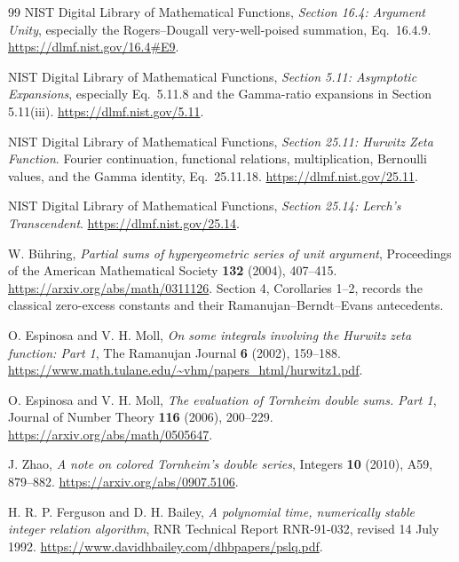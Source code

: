 \begin{thebibliography}{99}
NIST Digital Library of Mathematical Functions,
\emph{Section 16.4: Argument Unity}, especially the Rogers--Dougall
very-well-poised summation, Eq.~16.4.9.
\url{https://dlmf.nist.gov/16.4#E9}.

NIST Digital Library of Mathematical Functions,
\emph{Section 5.11: Asymptotic Expansions}, especially Eq.~5.11.8
and the Gamma-ratio expansions in Section 5.11(iii).
\url{https://dlmf.nist.gov/5.11}.

NIST Digital Library of Mathematical Functions,
\emph{Section 25.11: Hurwitz Zeta Function}.
Fourier continuation, functional relations, multiplication,
Bernoulli values, and the Gamma identity, Eq.~25.11.18.
\url{https://dlmf.nist.gov/25.11}.

NIST Digital Library of Mathematical Functions,
\emph{Section 25.14: Lerch's Transcendent}.
\url{https://dlmf.nist.gov/25.14}.

W. B\"uhring,
\emph{Partial sums of hypergeometric series of unit argument},
Proceedings of the American Mathematical Society \textbf{132}
(2004), 407--415.
\url{https://arxiv.org/abs/math/0311126}.
Section 4, Corollaries 1--2, records the classical zero-excess
constants and their Ramanujan--Berndt--Evans antecedents.

O. Espinosa and V. H. Moll,
\emph{On some integrals involving the Hurwitz zeta function: Part 1},
The Ramanujan Journal \textbf{6} (2002), 159--188.
\url{https://www.math.tulane.edu/~vhm/papers_html/hurwitz1.pdf}.

O. Espinosa and V. H. Moll,
\emph{The evaluation of Tornheim double sums. Part 1},
Journal of Number Theory \textbf{116} (2006), 200--229.
\url{https://arxiv.org/abs/math/0505647}.

J. Zhao,
\emph{A note on colored Tornheim's double series},
Integers \textbf{10} (2010), A59, 879--882.
\url{https://arxiv.org/abs/0907.5106}.

H. R. P. Ferguson and D. H. Bailey,
\emph{A polynomial time, numerically stable integer relation algorithm},
RNR Technical Report RNR-91-032, revised 14 July 1992.
\url{https://www.davidhbailey.com/dhbpapers/pslq.pdf}.

\end{thebibliography}

